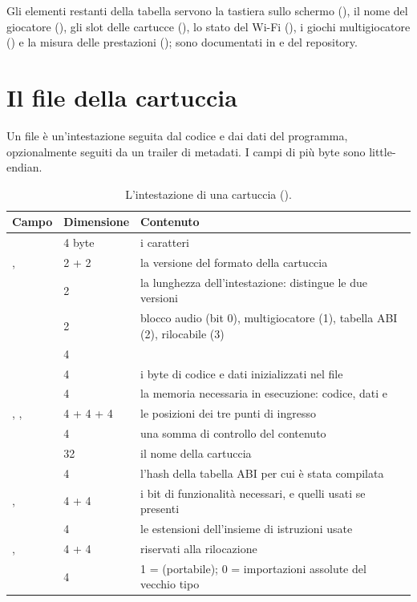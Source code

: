 Gli elementi restanti della tabella servono la tastiera sullo schermo
(), il nome del giocatore
(), gli slot delle cartucce
(), lo stato del Wi-Fi (), i giochi
multigiocatore () e la misura delle prestazioni
(); sono documentati in  e
 del repository.

\section{Il file della cartuccia}

Un file  è un'intestazione seguita dal codice e dai dati del
programma, opzionalmente seguiti da un trailer di metadati. I campi di più
byte sono little-endian.

\begin{table}[htb]
\centering\small
\caption{L'intestazione di una cartuccia ().}\label{tab:prg:header}
\begin{tabularx}{\textwidth}{@{}P{0.3\textwidth}lL@{}}
\toprule
\textbf{Campo} & \textbf{Dimensione} & \textbf{Contenuto}\\
\midrule
{} & 4 byte & i caratteri \\
,  & 2 + 2 & la versione del formato della cartuccia\\
 & 2 & la lunghezza dell'intestazione: distingue le due versioni\\
 & 2 & blocco audio (bit 0), multigiocatore (1), tabella ABI (2), rilocabile (3)\\
 & 4 & \\
 & 4 & i byte di codice e dati inizializzati nel file\\
 & 4 & la memoria necessaria in esecuzione: codice, dati e \\
, ,  & 4 + 4 + 4 & le posizioni dei tre punti di ingresso\\
 & 4 & una somma di controllo del contenuto\\
 & 32 & il nome della cartuccia\\
\midrule
{} & 4 & l'hash della tabella ABI per cui è stata compilata\\
,  & 4 + 4 & i bit di funzionalità necessari, e quelli usati se presenti\\
 & 4 & le estensioni dell'insieme di istruzioni usate\\
,  & 4 + 4 & riservati alla rilocazione\\
 & 4 & 1 =  (portabile); 0 = importazioni assolute del vecchio tipo\\
\bottomrule
\end{tabularx}
\end{table}

